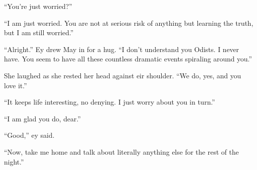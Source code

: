 ``You're just worried?''

``I am just worried. You are not at serious risk of anything but learning the truth, but I am still worried.''

``Alright.'' Ey drew May in for a hug. ``I don't understand you Odists. I never have. You seem to have all these countless dramatic events spiraling around you.''

She laughed as she rested her head against eir shoulder. ``We do, yes, and you love it.''

``It keeps life interesting, no denying. I just worry about you in turn.''

``I am glad you do, dear.''

``Good,'' ey said.

``Now, take me home and talk about literally anything else for the rest of the night.''
